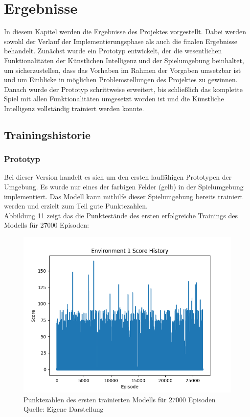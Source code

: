 \section{Ergebnisse}
In diesem Kapitel werden die Ergebnisse des Projektes vorgestellt. Dabei werden sowohl der Verlauf der Implementierungsphase als auch die finalen Ergebnisse behandelt. Zunächst wurde ein Prototyp entwickelt, der die wesentlichen Funktionalitäten der Künstlichen Intelligenz und der Spielumgebung beinhaltet, um sicherzustellen, dass das Vorhaben im Rahmen der Vorgaben umsetzbar ist und um Einblicke in möglichen Problemstellungen des Projektes zu gewinnen. Danach wurde der Prototyp schrittweise erweitert, bis schließlich das komplette Spiel mit allen Funktionalitäten umgesetzt worden ist und die Künstliche Intelligenz vollständig trainiert werden konnte.
\subsection{Trainingshistorie}
\subsubsection{Prototyp}
Bei dieser Version handelt es sich um den ersten lauffähigen Prototypen der Umgebung. Es wurde nur eines der farbigen Felder (gelb) in der Spielumgebung implementiert. Das Modell kann mithilfe dieser Spielumgebung bereits trainiert werden und erzielt zum Teil gute Punktezahlen.\\

Abbildung 11 zeigt das die Punktestände des ersten erfolgreiche Trainings des Modells für 27000 Episoden:
\nopagebreak
\begin{figure}[H]
	\includegraphics[width=1\textwidth]{Bilder/firstpropertraining} 
	\caption[Punktezahlen des ersten trainierten Modells für 27000 Episoden]{Punktezahlen des ersten trainierten Modells für 27000 Episoden\\ Quelle: Eigene Darstellung}
\end{figure}

